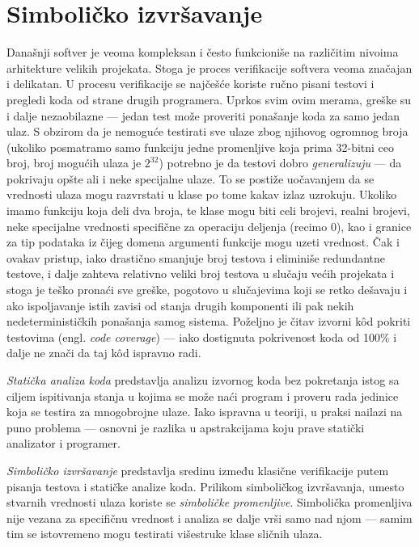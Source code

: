 \section{Simboličko izvršavanje}
\label{sec:Symbolics}

Današnji softver je veoma kompleksan i često funkcioniše na različitim nivoima arhitekture velikih projekata. Stoga je proces verifikacije softvera veoma značajan i delikatan. U procesu verifikacije se najčešće koriste ručno pisani testovi i pregledi koda od strane drugih programera. Uprkos svim ovim merama, greške su i dalje nezaobilazne --- jedan test može proveriti ponašanje koda za samo jedan ulaz. S obzirom da je nemoguće testirati sve ulaze zbog njihovog ogromnog broja (ukoliko posmatramo samo funkciju jedne promenljive koja prima 32-bitni ceo broj, broj mogućih ulaza je $2^{32}$) potrebno je da testovi dobro \emph{generalizuju} --- da pokrivaju opšte ali i neke specijalne ulaze. To se postiže uočavanjem da se vrednosti ulaza mogu razvrstati u klase po tome kakav izlaz uzrokuju. Ukoliko imamo funkciju koja deli dva broja, te klase mogu biti celi brojevi, realni brojevi, neke specijalne vrednosti specifične za operaciju deljenja (recimo $0$), kao i granice za tip podataka iz čijeg domena argumenti funkcije mogu uzeti vrednost. Čak i ovakav pristup, iako drastično smanjuje broj testova i eliminiše redundantne testove, i dalje zahteva relativno veliki broj testova u slučaju većih projekata i stoga je teško pronaći sve greške, pogotovo u slučajevima koji se retko dešavaju i ako ispoljavanje istih zavisi od stanja drugih komponenti ili pak nekih nedeterminističkih ponašanja samog sistema. Poželjno je čitav izvorni k\^od pokriti  testovima (engl. \emph{code coverage}) --- iako dostignuta pokrivenost koda od 100\% i dalje ne znači da taj k\^od ispravno radi.

\emph{Statička analiza koda} predstavlja analizu izvornog koda bez pokretanja istog sa ciljem ispitivanja stanja u kojima se može naći program i proveru rada jedinice koja se testira za mnogobrojne ulaze. Iako ispravna u teoriji, u praksi nailazi na puno problema --- osnovni je razlika u apstrakcijama koju prave statički analizator i programer.

\emph{Simboličko izvršavanje} \cite{SymbolicExecution} predstavlja sredinu između klasične verifikacije putem pisanja testova i statičke analize koda. Prilikom simboličkog izvršavanja, umesto stvarnih vrednosti ulaza koriste se \emph{simboličke promenljive}. Simbolička promenljiva nije vezana za specifičnu vrednost i analiza se dalje vrši samo nad njom --- samim tim se istovremeno mogu testirati višestruke klase sličnih ulaza. 

